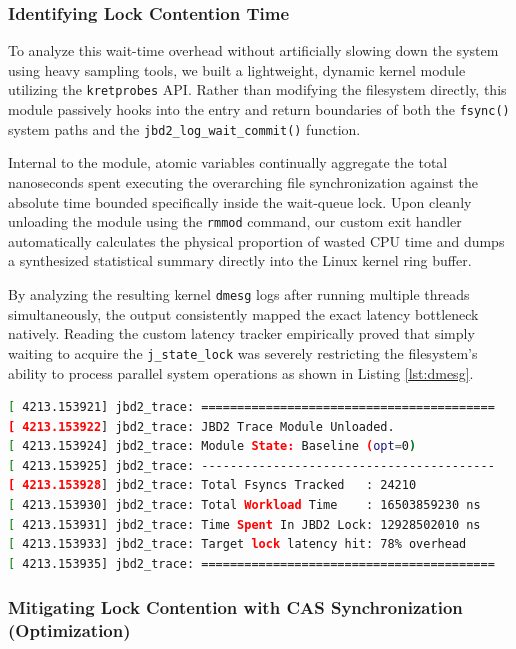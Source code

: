 \subsubsection{Identifying Lock Contention Time}

To analyze this wait-time overhead without artificially slowing down the system using heavy sampling tools, we built a lightweight, dynamic kernel module utilizing the \texttt{kretprobes} API. Rather than modifying the filesystem directly, this module passively hooks into the entry and return boundaries of both the \texttt{fsync()} system paths and the \texttt{jbd2\_log\_wait\_commit()} function. 

Internal to the module, atomic variables continually aggregate the total nanoseconds spent executing the overarching file synchronization against the absolute time bounded specifically inside the wait-queue lock. Upon cleanly unloading the module using the \texttt{rmmod} command, our custom exit handler automatically calculates the physical proportion of wasted CPU time and dumps a synthesized statistical summary directly into the Linux kernel ring buffer.

By analyzing the resulting kernel \texttt{dmesg} logs after running multiple threads simultaneously, the output consistently mapped the exact latency bottleneck natively. Reading the custom latency tracker empirically proved that simply waiting to acquire the \texttt{j\_state\_lock} was severely restricting the filesystem's ability to process parallel system operations as shown in Listing \ref{lst:dmesg}.

\begin{lstlisting}[caption={Sample \texttt{dmesg} kernel ring buffer output from the trace module upon removal.}, label={lst:dmesg}, language=bash]
[ 4213.153921] jbd2_trace: =========================================
[ 4213.153922] jbd2_trace: JBD2 Trace Module Unloaded.
[ 4213.153924] jbd2_trace: Module State: Baseline (opt=0)
[ 4213.153925] jbd2_trace: -----------------------------------------
[ 4213.153928] jbd2_trace: Total Fsyncs Tracked   : 24210
[ 4213.153930] jbd2_trace: Total Workload Time    : 16503859230 ns
[ 4213.153931] jbd2_trace: Time Spent In JBD2 Lock: 12928502010 ns
[ 4213.153933] jbd2_trace: Target lock latency hit: 78% overhead
[ 4213.153935] jbd2_trace: =========================================
\end{lstlisting}

\subsubsection{Mitigating Lock Contention with CAS Synchronization (Optimization) }

